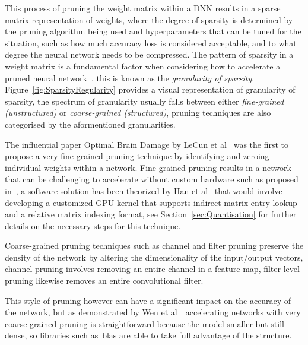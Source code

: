 \documentclass[../../D1.tex]{subfiles}
\begin{document}
This process of pruning the weight matrix within a DNN results in a sparse matrix representation of weights, where the degree of sparsity is determined by the pruning algorithm being used and hyperparameters that can be tuned for the situation, such as how much accuracy loss is considered acceptable, and to what degree the neural network needs to be compressed. 
The pattern of sparsity in a weight matrix is a fundamental factor when considering how to accelerate a pruned neural network~\autocite{maoExploringRegularitySparse2017}, this is known as the \emph{granularity of sparsity}.
Figure~\ref{fig:SparsityRegularity} provides a visual representation of granularity of sparsity, the spectrum of granularity usually falls between either \emph{fine-grained (unstructured)} or \emph{coarse-grained (structured)}, pruning techniques are also categorised by the aformentioned granularities.


The influential paper Optimal Brain Damage by LeCun et al~\autocite{lecunOptimalBrainDamage} was the first to propose a very fine-grained pruning technique by identifying and zeroing individual weights within a network.
Fine-grained pruning results in a network that can be challenging to accelerate without custom hardware such as proposed in~\autocite{hanEIEEfficientInference2016,parasharSCNNAcceleratorCompressedsparse2017}, a software solution has been theorized by Han et al~\autocite{hanDeepCompressionCompressing2016} that would involve developing a customized GPU kernel that supports indirect matrix entry lookup and a relative matrix indexing format, see Section~\ref{sec:Quantisation} for further details on the necessary steps for this technique.


Coarse-grained pruning techniques such as channel and filter pruning preserve the density of the network by altering the dimensionality of the input/output vectors, channel pruning involves removing an entire channel in a feature map, filter level pruning likewise removes an entire convolutional filter. 

This style of pruning however can have a significant impact on the accuracy of the network, but as demonstrated by Wen et al~\autocite{wenLearningStructuredSparsity2016}~accelerating networks with very coarse-grained pruning is straightforward because the model smaller but still dense, so libraries such as~\acrshort{blas} are able to take full advantage of the structure. 
\end{document}
